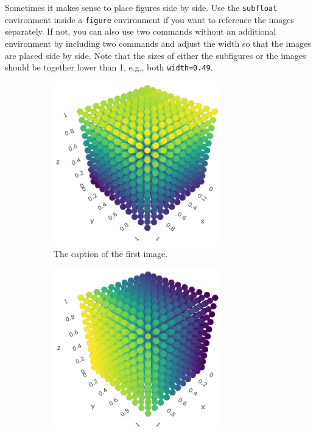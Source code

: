 \documentclass[
    language=german, %
    thesis=bachelor, %
    supervisor=postdoc, %
    multiauthor=false, %
    ]{settings/csssa-thesis}
\begin{document}
Sometimes it makes sense to place figures side by side. Use the \texttt{subfloat} environment inside a \texttt{figure} environment if you want to reference the images separately. If not, you can also use two commands without an additional environment by including two  commands and adjust the width so that the images are placed side by side. Note that the sizes of either the subfigures or the images should be together lower than 1, e.g., both \texttt{width=0.49}.

\begin{figure}[ht]
    \centering
    \begin{subfigure}{0.49\textwidth}
        \centering
        \includegraphics[width=0.8\textwidth]{figures/dummy-subfigure1.png}
        \caption{The caption of the first image.}\label{ch02:fig:fig1a}
    \end{subfigure}
    \begin{subfigure}{0.49\textwidth}
        \centering
        \includegraphics[width=0.8\textwidth]{figures/dummy-subfigure2.png}

\end{subfigure}
\end{figure}
\end{document}
